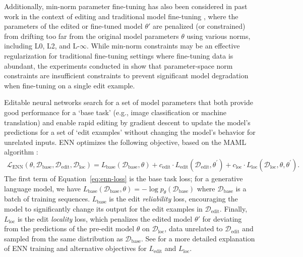 \documentclass{article}
\makeatletter
\newcommand{\lossl}{L_\text{loc}}
\newcommand{\rebuttal}[1]{#1}
\let\origsubsection\subsection
\renewcommand\subsection{\@ifstar{\starsubsection}{\nostarsubsection}}
\newcommand\nostarsubsection[1]
{\subsectionprelude\origsubsection{#1}\subsectionpostlude}
\newcommand\starsubsection[1]
{\subsectionprelude\origsubsection*{#1}\subsectionpostlude}
\newcommand\subsectionprelude{%
  \vspace{-1.5mm}
}
\newcommand\subsectionpostlude{%
  \vspace{-1.5mm}
}
\makeatother
\begin{document}
\begin{appendix}
\rebuttal{Additionally, min-norm parameter fine-tuning has also been considered in past work in the context of editing \citep{zhu2020modifying} and traditional model fine-tuning \citep{guo2021parameter}, where the parameters of the edited or fine-tuned model $\theta'$ are penalized (or constrained) from drifting too far from the original model parameters $\theta$ using various norms, including L0, L2, and L-$\infty$. While min-norm constraints may be an effective regularization for traditional fine-tuning settings where fine-tuning data is abundant, the experiments conducted in \citet{Cao2021EditingFK} show that parameter-space norm constraints are insufficient constraints to prevent significant model degradation when fine-tuning on a single edit example. }

\subsection{Editable Neural Networks (ENN)}
Editable neural networks \citep{Sinitsin2020Editable} search for a set of model parameters that both provide good performance for a `base task' (e.g., image classification or machine translation) and enable rapid editing by gradient descent to update the model's predictions for a set of `edit examples' without changing the model's behavior for unrelated inputs. ENN optimizes the following objective, based on the MAML algorithm \citep{finn2017maml}:
\begin{align}
    \mathcal{L}_\text{ENN}(\theta, \mathcal{D}_\text{base}, \mathcal{D}_\text{edit}, \mathcal{D}_\text{loc}) =  L_\text{base}(\mathcal{D}_\text{base}, \theta) + c_\text{edit}\cdot L_\text{edit}(\mathcal{D}_\text{edit}, \theta^\prime) + c_\text{loc}\cdot \lossl(\mathcal{D}_\text{loc}, \theta, \theta^\prime).\label{eq:enn-loss}
\end{align}
The first term of Equation~\ref{eq:enn-loss} is the base task loss; for a generative language model, we have $ L_\text{base}(\mathcal{D}_\text{base}, \theta) = -\log p_{\theta}(\mathcal{D}_\text{base})$ where $\mathcal{D}_\text{base}$ is a batch of training sequences. $ L_\text{base}$ is the edit \textit{reliability} loss, encouraging the model to significantly change its output for the edit examples in $\mathcal{D}_\text{edit}$. Finally, $\lossl$ is the edit \textit{locality} loss, which penalizes the edited model $\theta'$ for deviating from the predictions of the pre-edit model $\theta$ on $\mathcal{D}_\text{loc}$, data unrelated to $\mathcal{D}_\text{edit}$ and sampled from the same distribution as $\mathcal{D}_\text{base}$. See \citet{Sinitsin2020Editable} for a more detailed explanation of ENN training and alternative objectives for $ L_\text{edit}$ and $ \lossl$.


\end{appendix}
\end{document}
